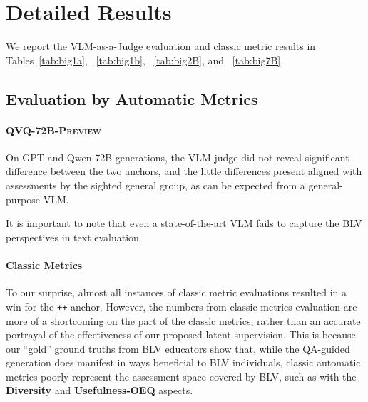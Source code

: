 \section{Detailed Results}\label{app:results}

We report the VLM-as-a-Judge evaluation and classic metric results in Tables~\ref{tab:big1a}, ~\ref{tab:big1b}, ~\ref{tab:big2B}, and ~\ref{tab:big7B}.

\subsection{Evaluation by Automatic Metrics}

\paragraph{\textsc{QVQ-72B-Preview}}

On GPT and Qwen 72B generations, the VLM judge did not reveal significant difference between the two anchors, and the little differences present aligned with assessments by the sighted general group, as can be expected from a general-purpose VLM.

It is important to note that even a state-of-the-art VLM fails to capture the BLV perspectives in text evaluation. 

\paragraph{Classic Metrics}

To our surprise, almost all instances of classic metric evaluations resulted in a win for the \texttt{++} anchor. However, the numbers from classic metrics evaluation are more of a shortcoming on the part of the classic metrics, rather than an accurate portrayal of the effectiveness of our proposed latent supervision. This is because our ``gold'' ground truths from BLV educators show that, while the QA-guided generation does manifest in ways beneficial to BLV individuals, classic automatic metrics poorly represent the assessment space covered by BLV, such as with the \textbf{Diversity} and \textbf{Usefulness-OEQ} aspects.



